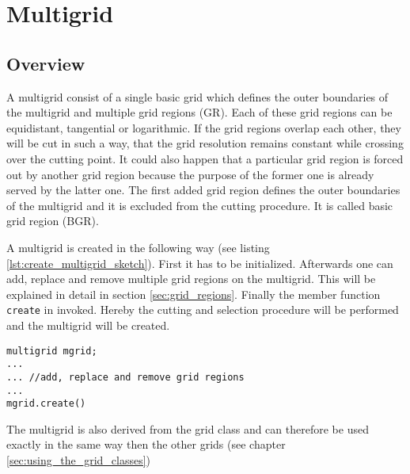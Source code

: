 \chapter{Multigrid} \label{chapter:multigrid}
\section{Overview}
A multigrid consist of a single basic grid which defines the outer boundaries of the multigrid and multiple grid regions (GR). Each of these grid regions can be equidistant, tangential or logarithmic. If the grid regions overlap each other, they will be cut in such a way, that the grid resolution remains constant while crossing over the cutting point. It could also happen that a particular grid region is forced out by another grid region because the purpose of the former one is already served by the latter one. The first added grid region defines the outer boundaries of the multigrid and it is excluded from the cutting procedure. It is called basic grid region (BGR).

A multigrid is created in the following way (see listing \ref{lst:create_multigrid_sketch}). First it has to be initialized. Afterwards one can add, replace and remove multiple grid regions on the multigrid. This will be explained in detail in section \ref{sec:grid_regions}. Finally the member function \texttt{create} in invoked. Hereby the cutting and selection procedure will be performed and the multigrid will be created. 
\begin{lstlisting}[caption={Creating a multigrid},	label={lst:create_multigrid_sketch}]
multigrid mgrid;
... 
... //add, replace and remove grid regions
...
mgrid.create()
\end{lstlisting}
The multigrid is also derived from the grid class and can therefore be used exactly in the same way then the other grids (see chapter \ref{sec:using_the_grid_classes})

